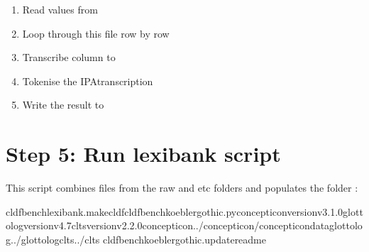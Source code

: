 \documentclass[letterpaper,10pt,english]{sphinxmanual}
\begin{document}
\begin{fulllineitems}
\label{\detokenize{mkcldf:koeblergothiccommands.makeortho.run}}
\pysigstartsignatures
{}
\pysigstopsignatures\begin{enumerate}
%
\item {} 
\sphinxAtStartPar
Read values from 

\item {} 
\sphinxAtStartPar
Loop through this file row by row

\item {} 
\sphinxAtStartPar
Transcribe column  to 

\item {} 
\sphinxAtStartPar
Tokenise the IPA\sphinxhyphen{}transcription

\item {} 
\sphinxAtStartPar
Write the result to 

\end{enumerate}

\end{fulllineitems}



\section{Step 5: Run lexibank script}
\label{\detokenize{mkcldf:step-5-run-lexibank-script}}
\sphinxAtStartPar
This script combines files from the raw and etc folders and populates the
folder :

\begin{sphinxVerbatim}[commandchars=\\\{\}]
cldfbenchlexibank.makecldfcldfbench\PYGZus{}koeblergothic.py\PYGZhy{}\PYGZhy{}concepticon\PYGZhy{}versionv3.1.0\PYGZhy{}\PYGZhy{}glottolog\PYGZhy{}versionv4.7\PYGZhy{}\PYGZhy{}clts\PYGZhy{}versionv2.2.0\PYGZhy{}\PYGZhy{}concepticon../concepticon/concepticon\PYGZhy{}data\PYGZhy{}\PYGZhy{}glottolog../glottolog\PYGZhy{}\PYGZhy{}clts../clts
cldfbenchkoeblergothic.update\PYGZus{}readme
\end{sphinxVerbatim}
\end{document}
